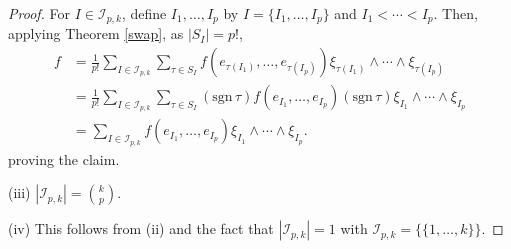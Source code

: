 \documentclass{article}
\newcommand{\sgn}{\mathrm{sgn}\,}
\theoremstyle{definition}
\begin{document}
\begin{proof}
For $I \in \mathscr{I}_{p,k}$, define $I_1,\ldots,I_p$ by $I=\{I_1,\ldots,I_p\}$ and
$I_1<\cdots<I_p$. 
Then, applying Theorem \ref{swap}, as $|S_I|=p!$,
\begin{align*}
f&= \frac{1}{p!} \sum_{I \in \mathscr{I}_{p,k}} \sum_{\tau \in S_I} f(e_{\tau(I_1)},\ldots,e_{\tau(I_p)}) \xi_{\tau(I_1)} \wedge \cdots \wedge \xi_{\tau(I_p)}\\
&=\frac{1}{p!} \sum_{I \in \mathscr{I}_{p,k}} \sum_{\tau \in S_I} (\sgn \tau) f(e_{I_1},\ldots,e_{I_p}) (\sgn \tau) \xi_{I_1} \wedge \cdots \wedge \xi_{I_p}\\
&=\sum_{I \in \mathscr{I}_{p,k}} f(e_{I_1},\ldots,e_{I_p}) \xi_{I_1} \wedge \cdots \wedge \xi_{I_p}.
\end{align*}
proving the claim.

(iii) $|\mathscr{I}_{p,k}| = \binom{k}{p}$.

(iv) This follows from (ii) and the fact that $|\mathscr{I}_{p,k}|=1$ with $\mathscr{I}_{p,k} = \{\{1,\ldots,k\}\}$.
\end{proof}



\end{document}
